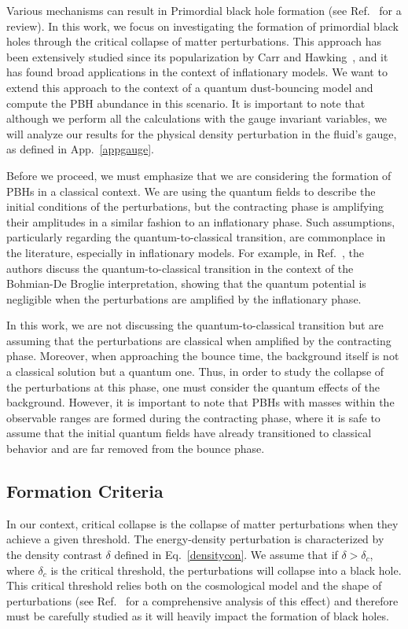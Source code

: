 \documentclass[a4paper,11pt]{article}
\begin{document}
Various mechanisms can result in Primordial black hole formation (see
Ref.~\cite{Escriva2023} for a review). In this work, we focus on investigating the
formation of primordial black holes through the critical collapse of matter
perturbations. This approach has been extensively studied since its popularization by
Carr and Hawking~\cite{Hawking1971, Carr1974}, and it has found broad applications in
the context of inflationary models. We want to extend this approach to the context of a
quantum dust-bouncing model and compute the PBH abundance in this scenario. It is
important to note that although we perform all the calculations with the gauge invariant
variables, we will analyze our results for the physical density perturbation in the
fluid's gauge, as defined in App.~\ref{appgauge}.

{\color{red} Before we proceed, we must emphasize that we are considering the formation
of PBHs in a classical context. We are using the quantum fields to describe the initial
conditions of the perturbations, but the contracting phase is amplifying their
amplitudes in a similar fashion to an inflationary phase. Such assumptions, particularly
regarding the quantum-to-classical transition, are commonplace in the literature,
especially in inflationary models. For example, in Ref.~\cite{Q2C}, the authors discuss
the quantum-to-classical transition in the context of the Bohmian-De Broglie
interpretation, showing that the quantum potential is negligible when the perturbations
are amplified by the inflationary phase.

In this work, we are not discussing the quantum-to-classical transition but are assuming
that the perturbations are classical when amplified by the contracting phase. Moreover,
when approaching the bounce time, the background itself is not a classical solution but
a quantum one. Thus, in order to study the collapse of the perturbations at this phase,
one must consider the quantum effects of the background. However, it is important to
note that PBHs with masses within the observable ranges are formed during the
contracting phase, where it is safe to assume that the initial quantum fields have
already transitioned to classical behavior and are far removed from the bounce phase.}

\subsection{Formation Criteria}

In our context, critical collapse is the collapse of matter perturbations when they
achieve a given threshold. The energy-density perturbation is characterized by the
density contrast $\delta$ defined in Eq.~\eqref{densitycon}. We assume that if $\delta >
	\delta_c$, where $\delta_c$ is the critical threshold, the perturbations will collapse
into a black hole. This critical threshold relies both on the cosmological model and the
shape of perturbations (see Ref.~\cite{Niemeyer1998, Musco2019} for a comprehensive
analysis of this effect) and therefore must be carefully studied as it will heavily
impact the formation of black holes.
\end{document}
